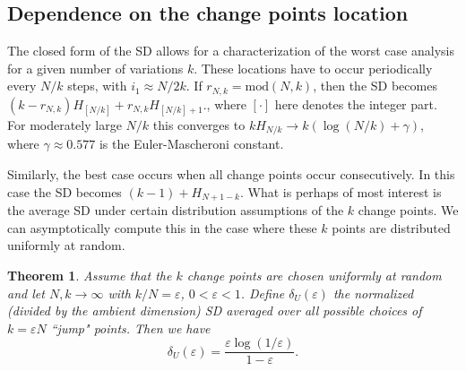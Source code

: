 \documentclass[11pt]{article}
\newcommand{\be}{\begin{equation}}
\newcommand{\ee}{\end{equation}}
\newtheorem{theorem}[proposition]{Theorem}
\begin{document}
\subsection{Dependence on the change points location} 
\noindent The closed form of the SD allows for a characterization of the worst case analysis for a given number of variations $k$. These locations have to occur periodically every $N/k$ steps, with $i_1 \approx N/2k$. If $r_{N,k} = \mathrm{mod}(N,k)$, then the SD becomes $(k-r_{N,k})H_{[N/k]} + r_{N,k}H_{[N/k]+1}.$, where $[\cdot]$ here denotes the integer part. For moderately large $N/k$ this converges to $kH_{N/k} \rightarrow k(\log(N/k) + \gamma)$, where $\gamma \approx 0.577$ is the Euler-Mascheroni constant. 

Similarly, the best case occurs when all change points occur consecutively. In this case the SD becomes $(k-1) + H_{N+1-k}$. What is perhaps of most interest is the average SD under certain distribution assumptions of the $k$ change points. We can  asymptotically compute this in the case where these $k$ points are distributed uniformly at random.
\begin{theorem}
	Assume that the $k$ change points are chosen uniformly at random and let $N,k\rightarrow\infty$ with $k/N = \varepsilon$, $0< \varepsilon < 1$. Define $\delta_{U}(\varepsilon)$ the normalized (divided by the ambient dimension) SD averaged over all possible choices of $k=\varepsilon N$ ``jump" points. Then we have
	\be
		\delta_{U}(\varepsilon) = \dfrac{\varepsilon\log(1/\varepsilon)}{1-\varepsilon}.
		\label{ptc-avg}
	\ee
\end{theorem}
\end{document}
